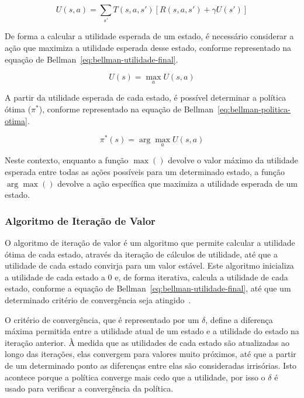 \begin{equation}
    \label{eq:bellman-utilidade-acao}
    U(s, a) = \sum_{s'} T(s, a, s') [R(s, a, s') + \gamma U(s')]
\end{equation}

De forma a calcular a utilidade esperada de um estado, é necessário considerar a ação que maximiza a utilidade esperada desse estado, conforme representado na equação de Bellman~\ref{eq:bellman-utilidade-final}.

\begin{equation}
    \label{eq:bellman-utilidade-final}
    U(s) = \max_{a} U(s, a)
\end{equation}

A partir da utilidade esperada de cada estado, é possível determinar a política ótima ($\pi^*$), conforme representado na equação de Bellman~\ref{eq:bellman-politica-otima}.

\begin{equation}
    \label{eq:bellman-politica-otima}
    \pi^*(s) = \arg\max_{a} U(s, a)
\end{equation}

Neste contexto, enquanto a função $\max()$ devolve o valor máximo da utilidade esperada entre todas as ações possíveis para um determinado estado,
a função $\arg\max()$ devolve a ação específica que maximiza a utilidade esperada de um estado.

\subsubsection{Algoritmo de Iteração de Valor}\label{subsubsec:algoritmo-iteracao-valor}

O algoritmo de iteração de valor é um algoritmo que permite calcular a utilidade ótima de cada estado, através da iteração de cálculos de utilidade, até que a utilidade de cada estado convirja para um valor estável.
Este algoritmo inicializa a utilidade de cada estado a 0 e, de forma iterativa, calcula a utilidade de cada estado, conforme a equação de Bellman~\ref{eq:bellman-utilidade-final}, até que um determinado critério de convergência seja atingido~\cite{isel:iasa:slides:processos-decisao-sequencial}.

O critério de convergência, que é representado por um $\delta$, define a diferença máxima permitida entre a utilidade atual de um estado e a utilidade do estado na iteração anterior.
À medida que as utilidades de cada estado são atualizadas ao longo das iterações, elas convergem para valores muito próximos, até que a partir de um determinado ponto as diferenças entre elas são consideradas irrisórias.
Isto acontece porque a política converge mais cedo que a utilidade, por isso o $\delta$ é usado para verificar a convergência da política.

